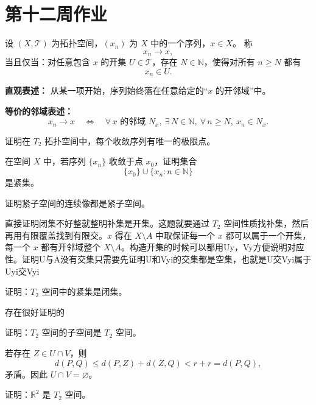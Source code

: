 \section{第十二周作业}
\begin{definition}[序列的拓扑收敛]
设 $(X,\mathcal T)$ 为拓扑空间，$(x_n)$ 为 $X$ 中的一个序列，$x\in X$。
称
\[
x_n \to x,
\]
当且仅当：对任意包含 $x$ 的开集 $U\in\mathcal T$，存在 $N\in\mathbb N$，使得对所有 $n\ge N$ 都有
\[
x_n\in U.
\]
\end{definition}

\noindent
\textbf{直观表述：} 从某一项开始，序列始终落在任意给定的“$x$ 的开邻域”中。

\medskip
\noindent
\textbf{等价的邻域表述：}
\[
x_n\to x
\quad\Longleftrightarrow\quad
\forall\,\text{$x$ 的邻域 }N_x,\ \exists\,N\in\mathbb N,\ \forall\,n\ge N,\ x_n\in N_x.
\]
\begin{homework}[5.1]
证明在 $T_2$ 拓扑空间中，每个收敛序列有唯一的极限点。
\end{homework}

\begin{homework}[5.2]
在空间 $X$ 中，若序列 $\{x_n\}$ 收敛于点 $x_0$，证明集合
\[
\{x_0\}\cup\{x_n:n\in\mathbb{N}\}
\]
是紧集。
\end{homework}

\begin{homework}[2]
证明紧子空间的连续像都是紧子空间。
\end{homework}
\begin{dxtips}
   直接证明闭集不好整就整明补集是开集。这题就要通过 $T_2$ 空间性质找补集，然后再用有限覆盖找到有限交。$x$ 得在 $X\setminus A$ 中取保证每一个 $x$ 都可以属于一个开集，每一个 $x$ 都有开邻域整个 $X\setminus A$。构造开集的时候可以都用Uy，Vy方便说明对应性。证明U与A没有交集只需要先证明U和Vyi的交集都是空集，也就是U交Vyi属于Uyi交Vyi
\end{dxtips}
\begin{homework}[3]
证明：$T_2$ 空间中的紧集是闭集。
\end{homework}
\begin{dxtips}
    存在很好证明的
\end{dxtips}
\begin{homework}[6]
证明：$T_2$ 空间的子空间是 $T_2$ 空间。
\end{homework}
\begin{dxtips}
    
    
   若存在 $Z\in U\cap V$，则
\[
d(P,Q)\le d(P,Z)+d(Z,Q)< r+r = d(P,Q),
\]
矛盾。因此 $U\cap V=\varnothing$。 
\end{dxtips}
\begin{homework}[7]
证明：$\mathbb{R}^2$ 是 $T_2$ 空间。
\end{homework}

